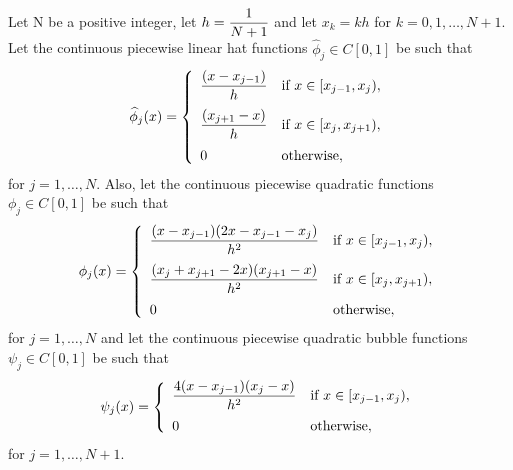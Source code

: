 
Let N be a positive integer, let $\displaystyle{h={1 \over N+1}}$ and let $x_k=kh$ for $k=0,1,\ldots,N+1$. Let the continuous piecewise linear hat functions $\widehat{\phi}_j\in C[0,1]$ be such that
\[
\widehat{\phi}_j(x) = \left\{\begin{array}{ll}
\displaystyle{{(x-x_{j-1}) \over h}} & \displaystyle{\mbox{if }x\in[x_{j-1},x_j)},
\\[10pt]
\displaystyle{{(x_{j+1}-x) \over h}} & \displaystyle{\mbox{if }x\in[x_j,x_{j+1})},
\\[10pt]
0 & \mbox{otherwise},
\end{array}\right.
\]
for $j=1,\ldots,N$. Also, let the continuous piecewise quadratic functions $\phi_j\in C[0,1]$ be such that
\[
\phi_j(x)=\left\{\begin{array}{ll}
\displaystyle{{(x-x_{j-1})(2x-x_{j-1}-x_j) \over h^2}} & \displaystyle{\mbox{if }x\in[x_{j-1},x_j)},
\\[10pt]
\displaystyle{{(x_j+x_{j+1}-2x)(x_{j+1}-x) \over h^2}} & \displaystyle{\mbox{if }x\in[x_j,x_{j+1})},
\\[10pt]
0 & \mbox{otherwise},
\end{array}\right.
\]
for $j=1,\ldots,N$ and let the continuous piecewise quadratic bubble functions $\psi_j\in C[0,1]$ be such that
\[
\psi_j(x)=\left\{\begin{array}{ll}
\displaystyle{{4(x-x_{j-1})(x_j-x) \over h^2}} & \displaystyle{\mbox{if }x\in[x_{j-1},x_j)},
\\[10pt]
0 & \mbox{otherwise},
\end{array}\right.
\]
for $j=1,\ldots,N+1$.
\\
